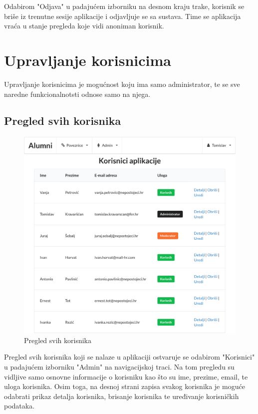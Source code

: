 \documentclass[zavrsni, numeric]{fer}
\begin{document}
Odabirom "Odjava" u padajućem izborniku na desnom kraju trake, korisnik se briše iz trenutne sesije aplikacije i odjavljuje se sa sustava. Time se aplikacija vraća u stanje pregleda koje vidi anoniman korisnik.

\section{Upravljanje korisnicima}
Upravljanje korisnicima je mogućnost koju ima samo administrator, te se sve naredne funkcionalnotsti odnose samo na njega.

\subsection{Pregled svih korisnika}

\begin{figure}[H]
	\centering
	\includegraphics[width=13cm]{slike/korisnici.png}
	\caption{Pregled svih korisnika}
	\label{fig:korisnici}
\end{figure}

Pregled svih korisnika koji se nalaze u aplikaciji ostvaruje se odabirom "Korisnici" u padajućem izborniku "Admin" na navigacijskoj traci. Na tom pregledu su vidljive samo osnovne informacije o korisniku kao što su ime, prezime, email, te uloga korisnika. Osim toga, na desnoj strani zapisa svakog korisnika je moguće odabrati prikaz detalja korisnika, brisanje korisnika te uređivanje korisničkih podataka.
\end{document}
